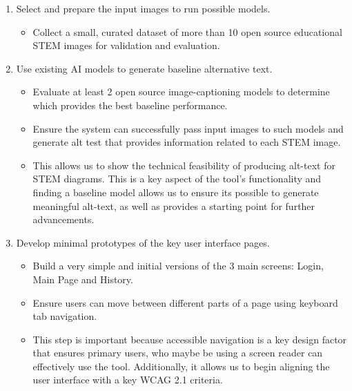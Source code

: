 \documentclass{article}
\begin{document}
\begin{enumerate}
    \item Select and prepare the input images to run possible models.  
    \begin{itemize}
        \item Collect a small, curated dataset of more than 10 open source educational STEM images for validation and evaluation.
    \end{itemize}

    \item Use existing AI models to generate baseline alternative text.
    \begin{itemize}
        \item Evaluate at least 2 open source image-captioning models to determine which provides the best baseline performance.
        \item Ensure the system can successfully pass input images to such models and generate alt test that provides information related to each STEM image. 
        \item This allows us to show the technical feasibility of producing alt-text for STEM diagrams. This is a key aspect of the tool's functionality and finding a baseline model allows us to ensure its possible to generate meaningful alt-text, as well as provides a starting point for further advancements.
    \end{itemize}

    \item Develop minimal prototypes of the key user interface pages.
    \begin{itemize}
        \item Build a very simple and initial versions of the 3 main screens: Login, Main Page and History. 
        \item Ensure users can move between different parts of a page using keyboard tab navigation. 
        \item This step is important because accessible navigation is a key design factor that ensures primary users, who maybe be using a screen reader can effectively use the tool. Additionally, it allows us to begin aligning the user interface with a key WCAG 2.1 criteria. 
    \end{itemize}
\end{enumerate}
\end{document}
